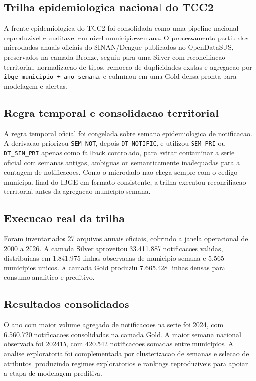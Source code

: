 
\subsection{Trilha epidemiologica nacional do TCC2}
A frente epidemiologica do TCC2 foi consolidada como uma pipeline nacional reproduzivel e auditavel em nivel municipio-semana. O processamento partiu dos microdados anuais oficiais do SINAN/Dengue publicados no OpenDataSUS, preservados na camada Bronze, seguiu para uma Silver com reconciliacao territorial, normalizacao de tipos, remocao de duplicidades exatas e agregacao por \texttt{ibge\_municipio + ano\_semana}, e culminou em uma Gold densa pronta para modelagem e alertas.

\subsection{Regra temporal e consolidacao territorial}
A regra temporal oficial foi congelada sobre semana epidemiologica de notificacao. A derivacao priorizou \texttt{SEM\_NOT}, depois \texttt{DT\_NOTIFIC}, e utilizou \texttt{SEM\_PRI} ou \texttt{DT\_SIN\_PRI} apenas como fallback controlado, para evitar contaminar a serie oficial com semanas antigas, ambiguas ou semanticamente inadequadas para a contagem de notificacoes. Como o microdado nao chega sempre com o codigo municipal final do IBGE em formato consistente, a trilha executou reconciliacao territorial antes da agregacao municipio-semana.

\subsection{Execucao real da trilha}
Foram inventariados 27 arquivos anuais oficiais, cobrindo a janela operacional de 2000 a 2026. A camada Silver aproveitou 33.411.887 notificacoes validas, distribuidas em 1.841.975 linhas observadas de municipio-semana e 5.565 municipios unicos. A camada Gold produziu 7.665.428 linhas densas para consumo analitico e preditivo.

\subsection{Resultados consolidados}
O ano com maior volume agregado de notificacoes na serie foi 2024, com 6.560.720 notificacoes consolidadas na camada Gold.
A maior semana nacional observada foi 202415, com 420.542 notificacoes somadas entre municipios.
A analise exploratoria foi complementada por clusterizacao de semanas e selecao de atributos, produzindo regimes exploratorios e rankings reproduziveis para apoiar a etapa de modelagem preditiva.

